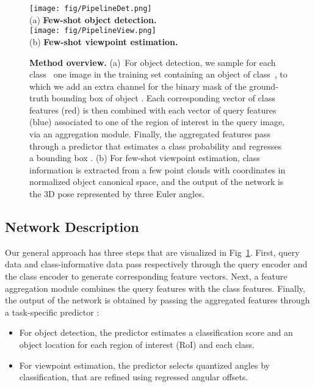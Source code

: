 \documentclass[runningheads]{llncs}
\begin{document}
\begin{figure}[t]
    \centering
    \texttt{[image: fig/PipelineDet.png]} \\
    (a) {\bf Few-shot object detection.} \\ 
\text{\;}
\texttt{[image: fig/PipelineView.png]} \\
    (b) {\bf Few-shot viewpoint estimation.} \\
    \caption{
    \textbf{Method overview.}\newline
    \hspace*{3mm}(a)~For object detection, we sample for each class~ one image  in the training set containing an object  of class~, to which we add an extra channel for the binary mask  of the ground-truth bounding box  of object . Each corresponding vector of class features  (red) is then combined with each vector of query features  (blue) associated to one of the region of interest  in the query image, via an aggregation module. Finally, the aggregated features  pass through a predictor that estimates a class probability  and regresses a bounding box .
\newline\hspace*{3mm}(b) For few-shot viewpoint estimation, class information is extracted from a few point clouds with coordinates in normalized object canonical space, and the output of the network is the 3D pose represented by three Euler angles.
    }
    \label{fig:overview}
\end{figure}



\subsection{Network Description}
\label{sec:network}


Our general approach has three steps that are visualized in Fig~\ref{fig:overview}.
First, query data  and class-informative data  pass respectively through the query encoder  and the class encoder  to generate corresponding feature vectors.
Next, a feature aggregation module  combines the query features with the class features.
Finally, the output of the network is obtained by passing the aggregated features through a task-specific predictor :
\begin{itemize}[topsep=1pt,itemsep=1pt]
    \item For object detection, the predictor estimates a classification score and an object location for each region of interest (RoI) and each class.
    \item For viewpoint estimation, the predictor selects quantized angles by classification, that are refined using regressed angular offsets.
\end{itemize}
\end{document}
